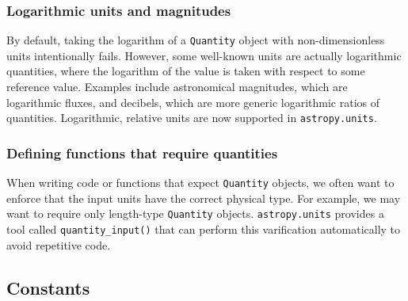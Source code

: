 \documentclass[modern]{aastex61}
\newcommand{\package}[1]{\texttt{#1}\xspace}
\newcommand{\astropypkg}{\package{astropy}}
\newcommand{\inlinecomment}[2]{\todo[inline]{#1: #2}\xspace}
\begin{document}


\subsubsection{Logarithmic units and magnitudes}
        By default, taking the logarithm of
        a \texttt{Quantity} object with non-dimensionless units intentionally
        fails.
        However, some well-known units are actually logarithmic quantities,
        where the logarithm of the value is taken with respect to some reference
        value.
        Examples include astronomical magnitudes, which are logarithmic fluxes,
        and decibels, which are more generic logarithmic ratios of quantities.
        Logarithmic, relative units are now supported in \texttt{astropy.units}.

\subsubsection{Defining functions that require quantities}
        When writing code or
        functions that expect \texttt{Quantity} objects, we often want to
        enforce that the input units have the correct physical type.
        For example, we may want to require only length-type \texttt{Quantity}
        objects.
        \texttt{astropy.units} provides a tool called \texttt{quantity\_input()}
        that can perform this varification automatically to avoid repetitive
        code.


\subsection{Constants}
\end{document}
